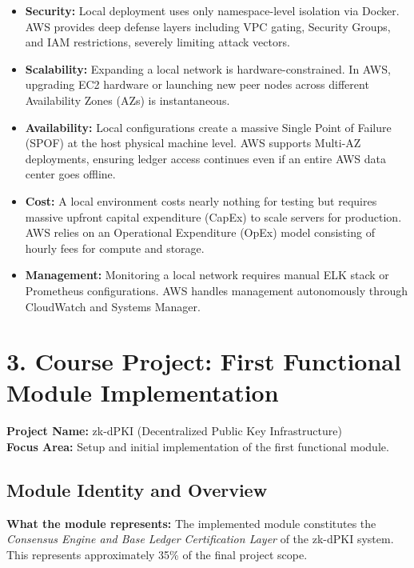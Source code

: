 \documentclass[12pt,a4paper]{article}
\begin{document}
\begin{itemize}
    \item \textbf{Security:} Local deployment uses only namespace-level isolation via Docker. AWS provides deep defense layers including VPC gating, Security Groups, and IAM restrictions, severely limiting attack vectors.
    \item \textbf{Scalability:} Expanding a local network is hardware-constrained. In AWS, upgrading EC2 hardware or launching new peer nodes across different Availability Zones (AZs) is instantaneous.
    \item \textbf{Availability:} Local configurations create a massive Single Point of Failure (SPOF) at the host physical machine level. AWS supports Multi-AZ deployments, ensuring ledger access continues even if an entire AWS data center goes offline.
    \item \textbf{Cost:} A local environment costs nearly nothing for testing but requires massive upfront capital expenditure (CapEx) to scale servers for production. AWS relies on an Operational Expenditure (OpEx) model consisting of hourly fees for compute and storage.
    \item \textbf{Management:} Monitoring a local network requires manual ELK stack or Prometheus configurations. AWS handles management autonomously through CloudWatch and Systems Manager.
\end{itemize}

\section{3. Course Project: First Functional Module Implementation}

\textbf{Project Name:} zk-dPKI (Decentralized Public Key Infrastructure) \\
\textbf{Focus Area:} Setup and initial implementation of the first functional module.

\subsection{Module Identity and Overview}
\textbf{What the module represents:} The implemented module constitutes the \textit{Consensus Engine and Base Ledger Certification Layer} of the zk-dPKI system. This represents approximately 35\% of the final project scope.
\end{document}
